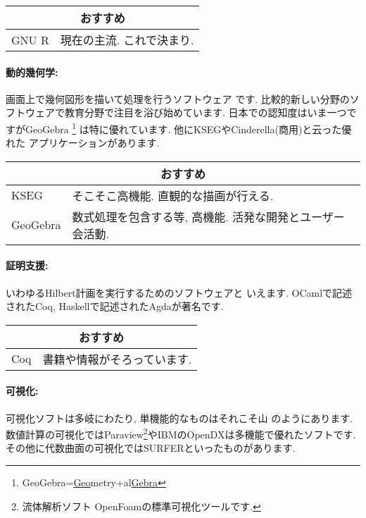 \vspace{0.5cm}
{\footnotesize
\begin{tabularx}{7cm}{l X}
\multicolumn{2}{c}{おすすめ}\\\hline
GNU R& 現在の主流. これで決まり.\\\hline
\end{tabularx}
}
\vspace{0.5cm}

\paragraph{動的幾何学:} 画面上で幾何図形を描いて処理を行うソフトウェア
です. 比較的新しい分野のソフトウェアで教育分野で注目を浴び始めています.
 日本での認知度はいま一つですがGeoGebra
 \footnote{GeoGebra=\underline{Geo}metry+al\underline{Gebra}}
は特に優れています. 他にKSEGやCinderella(商用)と云った優れた
アプリケーションがあります.


\vspace{0.5cm}
{\footnotesize
\begin{tabularx}{7cm}{l X}
\multicolumn{2}{c}{おすすめ}\\\hline
KSEG& そこそこ高機能. 直観的な描画が行える.\\
GeoGebra&  数式処理を包含する等, 高機能. 活発な開発とユーザー会活動.\\\hline
\end{tabularx}
}
\vspace{0.5cm}

\paragraph{証明支援:} いわゆるHilbert計画を実行するためのソフトウェアと
いえます. OCamlで記述されたCoq, Haskellで記述されたAgdaが著名です.

\vspace{0.5cm}
{\footnotesize
\begin{tabularx}{7cm}{l X}
\multicolumn{2}{c}{おすすめ}\\\hline
Coq& 書籍や情報がそろっています.\\\hline
\end{tabularx}
}
\vspace{0.5cm}

\paragraph{可視化:} 可視化ソフトは多岐にわたり, 単機能的なものはそれこそ山
のようにあります. 数値計算の可視化ではParaview\footnote{流体解析ソフト
OpenFoamの標準可視化ツールです.}やIBMのOpenDXは多機能で優れたソフトです.
 その他に代数曲面の可視化ではSURFERといったものがあります.


